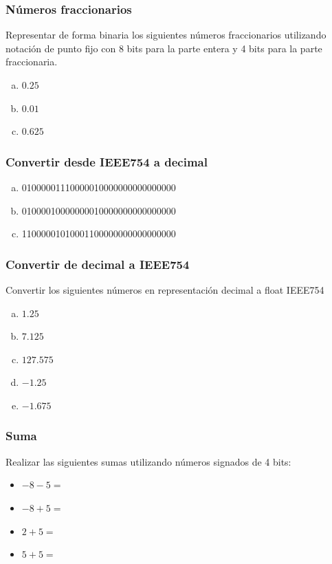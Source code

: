 \begin{ejercicioClase}
    \subsubsection{Números fraccionarios}
    Representar de forma binaria los siguientes números fraccionarios utilizando notación de punto fijo con 8 bits para la parte entera y 4 bits para la parte fraccionaria.
    \begin{enumerate}[a)]
      \item $0.25$
      \item $0.01$
      \item $0.625$
    \end{enumerate}

    \subsubsection{Convertir desde IEEE754 a decimal}
    \begin{enumerate}[a)]
      \item 01000001110000010000000000000000
      \item 01000010000000010000000000000000
      \item 11000001010001100000000000000000
    \end{enumerate}

    \subsubsection{Convertir de decimal a IEEE754}
    Convertir los siguientes números en representación decimal a float IEEE754
    \begin{enumerate}[a)]
      \item $1.25$
      \item $7.125$
      \item $127.575$
      \item $-1.25$
      \item $-1.675$
    \end{enumerate}

\end{ejercicioClase}



\subsubsection{Suma}
Realizar las siguientes sumas utilizando números signados de 4 bits:
\begin{itemize}
  \item $ -8-5= $
  \item $-8+5 = $
  \item $2+5  = $
  \item $5+5  = $
\end{itemize}

